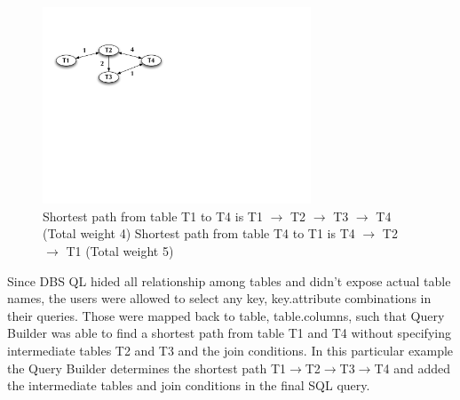 \documentclass[a4paper]{jpconf}
\begin{document}
\begin{figure}[htb]
\centering
\includegraphics[width=80mm]{DBSSql_shortestpath.pdf}
\caption{
Shortest path from table T1 to T4 is 
T1 $\rightarrow$ T2 $\rightarrow$ T3 $\rightarrow$ T4  (Total weight 4) 
Shortest path from table T4 to T1 is 
T4 $\rightarrow$ T2 $\rightarrow$ T1 (Total weight 5) 
}
\label{ShortestPath}
\end{figure}

Since DBS QL hided all relationship among tables and didn't
expose actual table names, the users were allowed to
select any key, key.attribute combinations in their queries.
Those were mapped back to table, table.columns, such that
Query Builder was able to find a shortest path
from table T1 and T4 without specifying intermediate 
tables T2 and T3 and the join conditions. In this
particular example the Query Builder determines
the shortest path 
T1$\rightarrow$T2$\rightarrow$T3$\rightarrow$T4 
and added the intermediate tables 
and join conditions in the final SQL query. 
\end{document}
